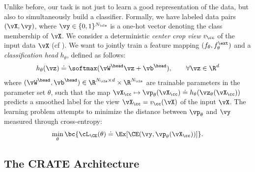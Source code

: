 \documentclass[../../book-main.tex]{subfiles}
\begin{document}
Unlike before, our task is not just to learn a good representation of the data, but also to simultaneously build a classifier. Formally, we have labeled data pairs \((\vX, \vy)\), where \(\vy \in \{0, 1\}^{N_{\cls}}\) is a one-hot vector denoting the class membership of \(\vX\). We consider a deterministic \textit{center crop view} \(v_{\cc}\) of the input data \(\vX\) (cf ). We want to jointly train a feature mapping \((f_{\theta}, f_{\theta}^{\ext})\) and a \textit{classification head} \(h_{\theta}\), defined as follows:
\begin{equation}
    h_{\theta}(\vz) \doteq \softmax(\vW^{\head}\vz + \vb^{\head}), \qquad  \forall \vz \in \R^{d}
\end{equation}
where \((\vW^{\head}, \vb^{\head}) \in \R^{N_{\cls} \times d} \times \R^{N_{\cls}}\) are trainable parameters in the parameter set \(\theta\), such that the map \(\vX_{\cc} \mapsto \vp_{\theta}(\vX_{\cc}) \doteq h_{\theta}(\vz_{\theta}(\vX_{\cc}))\) predicts a smoothed label for the view \(\vX_{\cc} = v_{\cc}(\vX)\) of the input \(\vX\). The learning problem attempts to minimize the distance between \(\vp_{\theta}\) and \(\vy\) measured through cross-entropy:
\begin{equation}\label{eq:classification_ce_loss}
    \min_{\theta}\bc{\cL_{\CE}(\theta) \doteq \Ex[\CE(\vy, \vp_{\theta}(\vX_{\cc}))]}.
\end{equation}


\subsection{The CRATE Architecture}\label{sub:image_classification_architecture}
\end{document}
